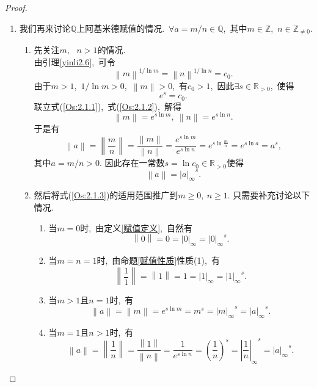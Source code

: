 \documentclass[UTF8, twoside]{ctexart}
\theoremstyle{nonumberplain}
\newtheorem{proof}{\heiti 证明}  %
\theoremstyle{nonumberplain}
\theoremstyle{plain}
\begin{document}
\begin{proof}
\begin{enumerate}
			\item 我们再来讨论$\mathbb{Q}$上阿基米德赋值的情况.\ 
			$\forall a=m/n\in \mathbb{Q}$,\ 其中$m\in \mathbb{Z}$,\ $n\in {{\mathbb{Z}}_{\ne 0}}$.
			\vskip 0.3cm
			\begin{enumerate}
				\item 先关注$m,\text{ }n>1$的情况.\ \\
				由引理\ref{yinli2.6},\ 可令
				\begin{equation} \label{Os:2.1.1}
					{{\left\| m \right\|}^{1/\ln m}}={{\left\| n \right\|}^{1/\ln n}}={{c}_{0}}.
				\end{equation}
				由于$m>1$,\ $1/\ln m>0$,\ $\left\| m \right\|>0$,\ 有${{c}_{0}}>1$,\ 因此$\exists s\in {{\mathbb{R}}_{>0}}$,\ 使得
				\begin{equation} \label{Os:2.1.2}
					{{e}^{s}}={{c}_{0}}.
				\end{equation}
				联立式(\ref{Os:2.1.1}),\ 式(\ref{Os:2.1.2}),\ 解得
				\[
					\left\| m \right\|={{e}^{s\ln m}},\ \left\| n \right\|={{e}^{s\ln n}}.
				\]
				于是有
				\[
					\left\| a \right\|=\left\| \frac{m}{n} \right\|=\frac{\left\| m \right\|}{\left\| n \right\|}=\frac{{{e}^{s\ln m}}}{{{e}^{s\ln n}}}={{e}^{s\ln \frac{m}{n}}}={{e}^{s\ln a}}={{a}^{s}},
				\]
				其中$a=m/n>0$. 因此存在一常数$s=\ln {{c}_{0}}\in {{\mathbb{R}}_{>0}}$使得
				\begin{equation} \label{Os:2.1.3}
					\left\| a \right\|={{\left| a \right|}_{\infty }}^{s}.
				\end{equation}
				\vskip 0.3cm
				
				\item 然后将式(\ref{Os:2.1.3})的适用范围推广到$m\ge 0,\ n\ge 1$. 只需要补充讨论以下情况.\ 
				\vskip 0.3cm
				\begin{enumerate}
					\item 当$m=0$时,\ 由定义\ref{赋值定义},\ 自然有
					\[
						\left\| 0 \right\|=0={{\left| 0 \right|}_{\infty }}={{\left| 0 \right|}_{\infty }}^{s}.
					\]
					\vskip 0.3cm
					\item 当$m=n=1$时,\ 由命题\ref{赋值性质}性质(1),\ 有
					\[
						\left\| \frac{1}{1} \right\|=\left\| 1 \right\|=1={{\left| 1 \right|}_{\infty }}={{\left| 1 \right|}_{\infty }}^{s}.
					\]
					\vskip 0.3cm
					\item 当$m>1$且$n=1$时,\ 有
					\[
						\left\| a \right\|=\left\| m \right\|={{e}^{s\ln m}}={{m}^{s}}={{\left| m \right|}_{\infty }}^{s}={{\left| a \right|}_{\infty }}^{s}.
					\]
					\vskip 0.3cm
					\item 当$m=1$且$n>1$时,\ 有
					\[
						\left\| a \right\|=\left\| \frac{1}{n} \right\|=\frac{\left\| 1 \right\|}{\left\| n \right\|}=\frac{1}{{{e}^{s\ln n}}}={{\left( \frac{1}{n} \right)}^{s}}={{\left| \frac{1}{n} \right|}_{\infty }}^{s}={{\left| a \right|}_{\infty }}^{s}.
					\]
				\end{enumerate}
				\vskip 0.3cm	
			

\end{enumerate}
\end{enumerate}
\end{proof}
\end{document}
